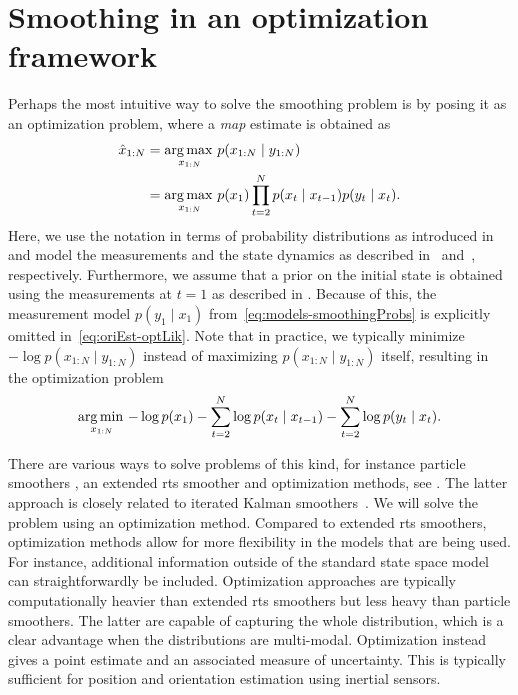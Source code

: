 \section{Smoothing in an optimization framework}
\label{sec:oriEst-smoothingOpt}
Perhaps the most intuitive way to solve the smoothing problem is by posing it as an optimization problem, where a \emph{\gls{map}} estimate is obtained as
\begin{align}
\hat{x}_{1:N} &= \operatorname*{arg \, max \,}_{x_{1:N}} p(x_{1:N} \mid y_{1:N} ) \label{eq:oriEst-optLik} \nonumber \\
&= \operatorname*{arg \, max \,}_{x_{1:N}} p(x_1) \prod_{t = 2}^N p(x_{t} \mid x_{t-1} ) p(y_t \mid x_t ). 
\end{align}
Here, we use the notation in terms of probability distributions as introduced in  and model the measurements and the state dynamics as described in~ and~, respectively. Furthermore, we assume that a prior on the initial state is obtained using the measurements at $t = 1$ as described in . Because of this, the measurement model $p(y_1 \mid x_1)$ from~\eqref{eq:models-smoothingProbs} is explicitly omitted in~\eqref{eq:oriEst-optLik}. Note that in practice, we typically minimize $-\log p(x_{1:N} \mid y_{1:N})$ instead of maximizing $p(x_{1:N} \mid y_{1:N})$ itself, resulting in the optimization problem
\begin{align}
\operatorname*{arg \, min \,}_{x_{1:N}} - \log p(x_1) - \sum_{t = 2}^N \log p(x_{t} \mid x_{t-1} ) - \sum_{t = 2}^N \log p(y_t \mid x_t ).\label{eq:oriEst-optNegLogLik}
\end{align}

There are various ways to solve problems of this kind, for instance particle smoothers \citep{lindstenS:2013}, an extended \gls{rts} smoother \citep{sarkka:2013} and optimization methods, see \eg \cite{nocedalW:2006,mattingleyB:2010}. The latter approach is closely related to iterated Kalman smoothers~\citep{bell:1994,jazwinski:1970}. We will solve the problem using an optimization method. Compared to extended \gls{rts} smoothers, optimization methods allow for more flexibility in the models that are being used. For instance, additional information outside of the standard state space model can straightforwardly be included. Optimization approaches are typically computationally heavier than extended \gls{rts} smoothers but less heavy than particle smoothers. The latter are capable of capturing the whole distribution, which is a clear advantage when the distributions are multi-modal. Optimization instead gives a point estimate and an associated measure of uncertainty. This is typically sufficient for position and orientation estimation using inertial sensors.

